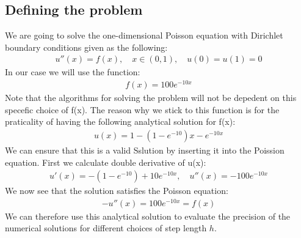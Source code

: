 \documentclass[american,a4paper,12pt]{article}
\begin{document}
  \subsection{Defining the problem}
    We are going to solve the one-dimensional Poisson equation with Dirichlet boundary conditions given as the following:
    \begin{align*}
      u''(x) = f(x), \quad x \in (0,1), \quad u(0) = u(1) = 0
    \end{align*}
    In our case we will use the function:
    \begin{align*}
      f(x) = 100e^{-10x}
    \end{align*}
    Note that the algorithms for solving the problem will not be depedent on this specefic choice of f(x). The reason why we stick to this function is for the praticality of having the following analytical solution for f(x):
    \begin{align*}
      u(x) = 1 - (1 - e^{-10})x - e^{-10x}
    \end{align*}
    We can ensure that this is a valid Sslution by inserting it into the Poission equation. First we calculate double derivative of u(x):
    \begin{align*}
      u'(x) = -(1 - e^{-10}) + 10e^{-10x}, \quad u''(x) = -100e^{-10x}
    \end{align*}
    We now see that the solution satisfies the Poisson equation:
    \begin{align*}
      -u''(x) = 100e^{-10x} = f(x)
    \end{align*}
    We can therefore use this analytical solution to evaluate the precision of the numerical solutions for different choices of step length $h$.
\end{document}
